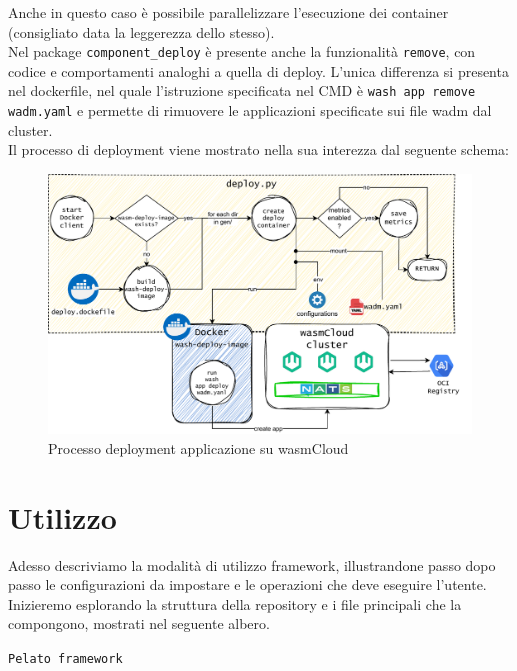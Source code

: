 Anche in questo caso è possibile parallelizzare l'esecuzione dei container (consigliato data la leggerezza dello stesso).\\
Nel package \texttt{component\_deploy} è presente anche la funzionalità \texttt{remove}, con codice e comportamenti analoghi a quella di deploy. L'unica differenza si presenta nel dockerfile, nel quale l'istruzione specificata nel CMD è \texttt{wash app remove wadm.yaml} e permette di rimuovere le applicazioni specificate sui file wadm dal cluster.\\
Il processo di deployment viene mostrato nella sua interezza dal seguente schema:

\FloatBarrier
\begin{figure}[h]
    \centering
    \includegraphics[width=\textwidth]{img/schemi/schemi-implementazione-deploy.drawio.pdf}
    \caption{Processo deployment applicazione su wasmCloud}
    \label{fig:impl_deploy}
\end{figure}
\FloatBarrier

\section{Utilizzo}

Adesso descriviamo la modalità di utilizzo framework, illustrandone passo dopo passo le configurazioni da impostare e le operazioni che deve eseguire l'utente. Inizieremo esplorando la struttura della repository e i file principali che la compongono, mostrati nel seguente albero.

\texttt{Pelato framework}

